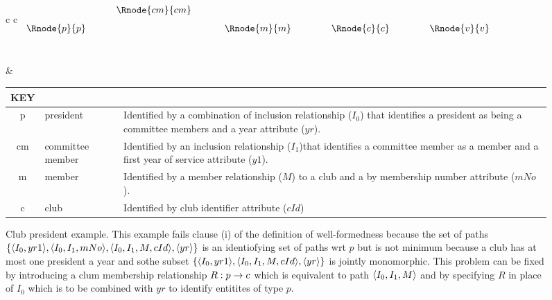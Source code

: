\begin{figure} [h]
\begin{center}
\begin{tabular}{c c}
$
\begin{array}{cp{0.4cm}cp{0.5cm}cp{0.75cm}cp{0.75cm}c}
              &&                &&               &&                &&               \\[0.25cm]
              && \Rnode{cm}{cm} &&               &&                &&               \\[0.25cm]
\Rnode{p}{p}	&&                && \Rnode{m}{m}  &&   \Rnode{c}{c} && \Rnode{v}{v}  \\[0.25cm]
	            &&  
\end{array}
$

\idcomp
{}
\idcomp
{}
\idcomp
{}
\idcomp
{}
\idcomp
{}
\idcomp
{}
\idcomp
& \footnotesize
\begin{tabular}{c p{1.5cm} p{4cm}}
KEY && \\
\hline
p  & president        & Identified by a combination of inclusion relationship ($I_0$) that identifies a
                       president as being a committee members and a year attribute ($yr$). \\
cm & committee member & Identified by an inclusion relationship ($I_1$)that identifies a committee member 
                         as a member and a first year of service attribute ($y1$).\\
m  & member           & Identified by a member relationship ($M$) to a club and a by membership 
                         number attribute ($mNo$). \\
c  & club             & Identified by club identifier attribute ($cId$)
\end{tabular} 
\end{tabular}
\end{center}
\caption{Club president example. 
This example fails clause (i) of the definition of well-formedness because
the set of paths $\left\{\langle I_0,yr1\rangle,\langle I_0,I_1,mNo\rangle, \langle I_0,I_1,M,cId\rangle, \langle yr\rangle\right\}$ is 
an identiofying set of paths wrt $p$ but is not minimum because a club has at most one president a year and sothe subset $\left\{\langle I_0,yr1\rangle, \langle I_0,I_1,M,cId\rangle, \langle yr\rangle\right\}$ is jointly monomorphic. 
This problem can be fixed by introducing a clum membership relationship $R: p \rightarrow c$ which is equivalent to
path $\langle I_0,I_1,M\rangle$ and by specifying $R$ in place of $I_0$ which is to be combined with $yr$ to identify entitites of type $p$.
}
\label{clubpresidentbeforenormalisation}
\end{figure}